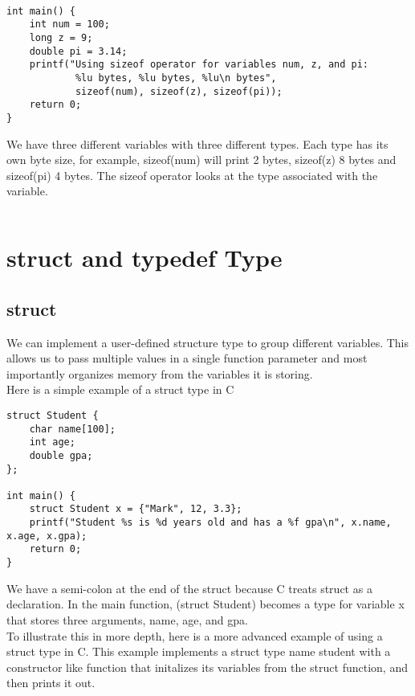 \documentclass{article}
\begin{document}
\begin{verbatim}

int main() {
	int num = 100;
	long z = 9;
	double pi = 3.14;
	printf("Using sizeof operator for variables num, z, and pi: 
			%lu bytes, %lu bytes, %lu\n bytes", 
			sizeof(num), sizeof(z), sizeof(pi));
	return 0;
}

\end{verbatim}

We have three different variables with three different types. Each type has its own byte size, for example, sizeof(num) will print 2 bytes, sizeof(z) 8 bytes
and sizeof(pi) 4 bytes. The sizeof operator looks at the type associated with the variable. 


\begin{verbatim}
\end{verbatim}




\section{struct and typedef Type}
\subsection*{struct}
We can implement a user-defined structure type to group different variables. This allows us to pass multiple values in a single function parameter and 
most importantly organizes memory from the variables it is storing. \\

Here is a simple example of a struct type in C

\begin{verbatim}
struct Student {
	char name[100];
	int age;
	double gpa;
};

int main() {
	struct Student x = {"Mark", 12, 3.3};
	printf("Student %s is %d years old and has a %f gpa\n", x.name, x.age, x.gpa);
	return 0;
}
\end{verbatim}

We have a semi-colon at the end of the struct because C treats struct as a declaration. In the main function, (struct Student) becomes a type for
variable x that stores three arguments, name, age, and gpa.\\

\noindent To illustrate this in more depth, here is a more advanced example of using a struct type in C. This example implements a struct type name student
with a constructor like function that initalizes its variables from the struct function, and then prints it out.
\end{document}
